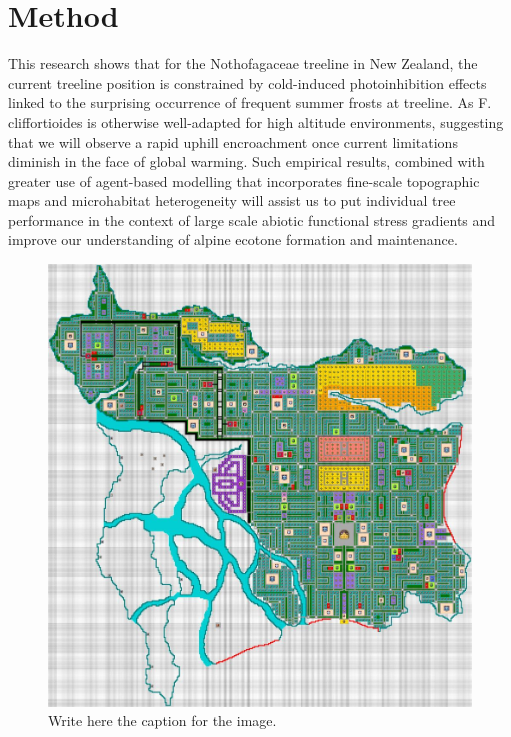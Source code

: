 \documentclass[12pt]{article}
\begin{document}
\section{Method}


\noindent This research shows that for the Nothofagaceae treeline in New Zealand, the current treeline position is constrained by cold-induced photoinhibition effects linked to the surprising occurrence of frequent summer frosts at treeline. As F. cliffortioides is otherwise well-adapted for high altitude environments, suggesting that we will observe a rapid uphill encroachment once current limitations diminish in the face of global warming. Such empirical results, combined with greater use of agent-based modelling that incorporates fine-scale topographic maps and microhabitat heterogeneity will assist us to put individual tree performance in the context of large scale abiotic functional stress gradients and improve our understanding of alpine ecotone formation and maintenance.




\begin{figure}[ht]  %
\centering %
\includegraphics[scale=0.2]{analysis/figures/Leiden_8.jpg}
\caption{Write here the caption for the image.}
\label{fig:image}
\end{figure}
\end{document}
